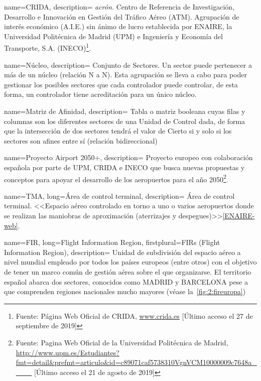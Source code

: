 {
    name={CRIDA},
    description=
    {   
        \textit{acrón.} Centro de Referencia de Investigación, Desarrollo e Innovación 
        en Gestión del Tráfico Aéreo (\gls{ATM}). Agrupación de interés económico (A.I.E.) sin ánimo de lucro 
        establecida por ENAIRE, la Universidad Politécnica de Madrid (UPM) e Ingeniería y Economía del Transporte, S.A. 
        (INECO)\footnote{Fuente: Página Web Oficial de CRIDA, \url{www.crida.es} [Último acceso el 27 de septiembre de 2019]}.
    }
}

{
    name={Núcleo},
    description=
    {   
        Conjunto de Sectores. Un sector puede pertenecer a más de un núcleo (relación N a N). Esta 
        agrupación se lleva a cabo para poder gestionar los posibles sectores que cada controlador puede controlar, de 
        esta 
        forma, un controlador tiene acreditación para un único núcleo.
    }
}

{
    name={Matriz de Afinidad},
    description=
    {   
        Tabla o matriz booleana cuyas filas y columnas son los diferentes sectores de 
        una Unidad de Control dada, de forma que la intersección de dos sectores tendrá el valor de Cierto si y solo si 
        los sectores son afines entre sí (relación bidireccional)
    }
}

{
    name={Proyecto Airport 2050+},
    description=
    {   
        Proyecto europeo con colaboración española por parte de UPM, CRIDA e INECO que busca nuevas propuestas y conceptos para apoyar el desarrollo de los aeropuertos para el año 2050\footnote{Fuente: Pagina Web Oficial de la Universidad Politécnica de Madrid, \url{http://www.upm.es/Estudiantes?fmt=detail&prefmt=articulo&id=c89071caf5738310VgnVCM10000009c7648a____} [Último acceso el 21 de agosto de 2019]}.
    }
}

{
    name={TMA},
    long={Área de control terminal},
    description=
    {   
        Área de control terminal. <<Espacio aéreo controlado en torno a uno o varios aeropuertos 
        donde se realizan las maniobras de aproximación (aterrizajes y despegues)>>\cref{ENAIRE-web}.
    }
}

{
    name={FIR},
    long={Flight Information Region},
    firstplural={FIRs (Flight Information Region)},
    description=
    {   
        Unidad de subdivisión del espacio aéreo a nivel mundial empleado por todos los países europeos (entre otros) 
        con el objetivo de tener un marco común de gestión aérea sobre el que organizarse. El territorio español abarca 
        dos sectores, conocidos como MADRID y BARCELONA pese a que comprenden regiones nacionales mucho mayores 
        (véase la~\autoref{fig:2:fireuropa})
    }
}



